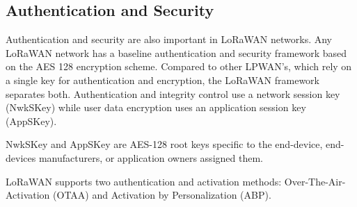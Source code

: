 \subsection{Authentication and Security}

Authentication and security are also important in LoRaWAN networks. Any LoRaWAN network has a baseline authentication and security framework based on the AES 128 encryption scheme. Compared to other LPWAN's, which rely on a single key for authentication and encryption, the LoRaWAN framework separates both. Authentication and integrity control use a network session key (NwkSKey) while user data encryption uses an application session key (AppSKey). \cite{ArduinoLoRaWAN101:2024}

NwkSKey and AppSKey are AES-128 root keys specific to the end-device, end-devices manufacturers, or application owners assigned them.

LoRaWAN supports two authentication and activation methods: Over-The-Air-Activation (OTAA) and Activation by Personalization (ABP).

